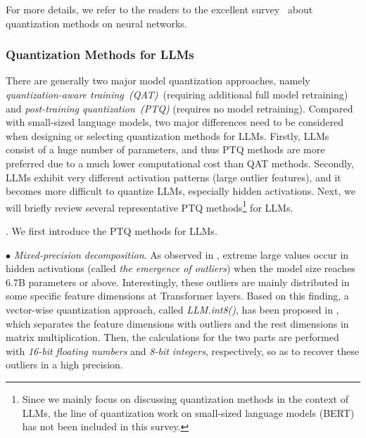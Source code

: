 For more details, we refer to the readers to the excellent  survey~\cite{Gholami-CoRR-2022-A} about quantization methods on neural networks.  




\subsubsection{Quantization Methods for LLMs}

There are generally two major model quantization approaches, namely \emph{quantization-aware training~(QAT)}~(requiring additional full model retraining) and \emph{post-training quantization~(PTQ)} (requires no model retraining). 
Compared with small-sized language models, two major differences need to be considered when designing or selecting quantization methods for LLMs. Firstly, LLMs consist of a huge number of parameters, and thus PTQ methods are more preferred due to a much lower computational cost than QAT methods. Secondly, LLMs exhibit very different activation patterns (\ie large outlier features), and it becomes more  difficult to quantize LLMs, especially  hidden activations. Next, we will briefly review several representative PTQ  methods\footnote{Since we mainly focus on discussing  quantization methods in the context of LLMs,  the line of  quantization work on small-sized language models (\eg BERT) has not been included in this survey. 
} for LLMs.   


. We first introduce the PTQ methods for LLMs. 


$\bullet$ \emph{Mixed-precision decomposition}. 
As observed in \cite{Dettmers-arxiv-2022-LLM}, extreme large values occur in hidden activations (called \emph{the emergence of outliers}) when the model size reaches  6.7B parameters or above. %
Interestingly, these outliers are mainly distributed in  some specific  feature dimensions  at Transformer layers. 
Based on this finding, a vector-wise  quantization approach, called \emph{LLM.int8()}, has been proposed in \cite{Dettmers-arxiv-2022-LLM}, which separates  the feature dimensions with outliers and the rest dimensions  in  matrix multiplication. 
Then, the calculations for the two parts are performed with \emph{16-bit floating numbers} and \emph{8-bit integers}, respectively, so as to recover these outliers in a high precision. 

